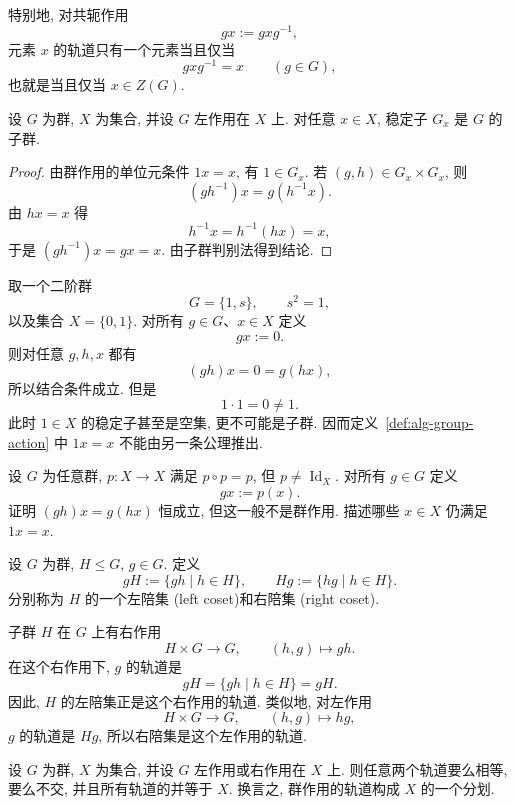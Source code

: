 \documentclass[usesamecnt, thmcnt=section, lang=cn, newtx, 10pt, scheme=chinese]{elegantbook}
\begin{document}
特别地, 对共轭作用
\[
 g x:=gxg^{-1},
\]
元素 $x$ 的轨道只有一个元素当且仅当
\[
 gxg^{-1}=x\qquad(g\in G),
\]
也就是当且仅当 $x\in Z(G)$.

\begin{proposition}\label{prop:alg-stabilizer-subgroup}
设 $G$ 为群, $X$ 为集合, 并设 $G$ 左作用在 $X$ 上. 对任意 $x\in X$, 稳定子 $G_x$ 是 $G$ 的子群.
\end{proposition}

\begin{proof}
由群作用的单位元条件 $1 x=x$, 有 $1\in G_x$. 若 $(g,h)\in G_x\times G_x$, 则
\[
 (gh^{-1}) x
 =g(h^{-1} x).
\]
由 $h x=x$ 得
\[
 h^{-1} x=h^{-1}(h x)=x,
\]
于是 $(gh^{-1}) x=g x=x$. 由子群判别法得到结论.
\end{proof}

\begin{instance}
取一个二阶群
\[
 G=\{1,s\},
 \qquad s^2=1,
\]
以及集合 $X=\{0,1\}$. 对所有 $g\in G$、$x\in X$ 定义
\[
 g x:=0.
\]
则对任意 $g,h,x$ 都有
\[
 (gh) x=0=g(h x),
\]
所以结合条件成立. 但是
\[
 1\cdot 1=0\neq1.
\]
此时 $1\in X$ 的稳定子甚至是空集, 更不可能是子群. 因而定义~\ref{def:alg-group-action} 中 $1 x=x$ 不能由另一条公理推出.
\end{instance}

\begin{exercise}\label{ex:alg-action-identity}
设 $G$ 为任意群, $p:X\to X$ 满足 $p\circ p=p$, 但 $p\neq\operatorname{Id}_X$. 对所有 $g\in G$ 定义
\[
 g x:=p(x).
\]
证明 $(gh) x=g(h x)$ 恒成立, 但这一般不是群作用. 描述哪些 $x\in X$ 仍满足 $1 x=x$.
\end{exercise}

\begin{definition}[陪集]\label{def:alg-coset}
设 $G$ 为群, $H\leq G$, $g\in G$. 定义
\[
 gH:=\{gh\mid h\in H\},
 \qquad
 Hg:=\{hg\mid h\in H\}.
\]
分别称为 $H$ 的一个{\color{blue}左陪集 (left coset)}和{\color{blue}右陪集 (right coset)}.

子群 $H$ 在 $G$ 上有右作用
\[
 H\times G\longrightarrow G,
 \qquad
 (h,g)\longmapsto gh.
\]
在这个右作用下, $g$ 的轨道是
\[
 g H=\{gh\mid h\in H\}=gH.
\]
因此, $H$ 的左陪集正是这个右作用的轨道. 类似地, 对左作用
\[
 H\times G\longrightarrow G,
 \qquad
 (h,g)\longmapsto hg,
\]
$g$ 的轨道是 $Hg$, 所以右陪集是这个左作用的轨道.
\end{definition}

\begin{proposition}\label{prop:alg-orbit-partition}
设 $G$ 为群, $X$ 为集合, 并设 $G$ 左作用或右作用在 $X$ 上. 则任意两个轨道要么相等, 要么不交, 并且所有轨道的并等于 $X$. 换言之, 群作用的轨道构成 $X$ 的一个分划.
\end{proposition}
\end{document}
